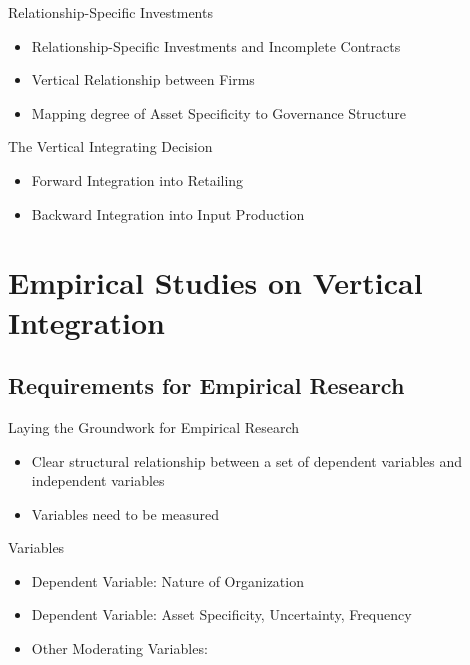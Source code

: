 \documentclass{beamer}
\begin{document}
\begin{frame}{Relationship-Specific Investments}
  \begin{itemize}
  \item<1-> {Relationship-Specific Investments and Incomplete Contracts \citep{Klein1978} }
  \item<2-> {Vertical Relationship between Firms \citep{Williamson1979}}
  \item<3-> {Mapping degree of Asset Specificity to Governance Structure \citep{Williamson1979}}
  \end{itemize}
\end{frame}


\begin{frame}{The Vertical Integrating Decision}
  \begin{itemize}
  \item{Forward Integration into Retailing}
  \item {Backward Integration into Input Production}
  \end{itemize}
\end{frame}

\section{Empirical Studies on Vertical Integration}

\subsection{Requirements for Empirical Research}

\begin{frame}{Laying the Groundwork for Empirical Research}
\begin{itemize}
\item{Clear structural relationship between a set of dependent variables and independent variables}
\item{Variables need to be measured}
\end{itemize}
\end{frame}

\begin{frame}{Variables}
\begin{itemize}
\item<1->{Dependent Variable: Nature of Organization }
\item<3->{Dependent Variable: Asset Specificity, Uncertainty, Frequency }
\item<5->{Other Moderating Variables:  }
\end{itemize}
\end{frame}
\end{document}
